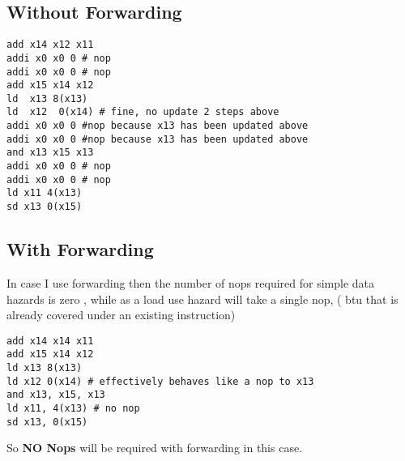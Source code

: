 \subsection{Without Forwarding}
\begin{lstlisting}
add x14 x12 x11
addi x0 x0 0 # nop
addi x0 x0 0 # nop
add x15 x14 x12
ld  x13 8(x13)
ld  x12  0(x14) # fine, no update 2 steps above
addi x0 x0 0 #nop because x13 has been updated above
addi x0 x0 0 #nop because x13 has been updated above
and x13 x15 x13 
addi x0 x0 0 # nop
addi x0 x0 0 # nop
ld x11 4(x13)
sd x13 0(x15)
\end{lstlisting}


\subsection{With Forwarding}
In case I use forwarding then the  number of nops required for simple data hazards is zero , while as  a load use hazard will take a single
nop, ( btu that is already covered under an existing instruction)
\begin{lstlisting}
add x14 x14 x11
add x15 x14 x12 
ld x13 8(x13)
ld x12 0(x14) # effectively behaves like a nop to x13
and x13, x15, x13
ld x11, 4(x13) # no nop
sd x13, 0(x15)
\end{lstlisting}
So \textbf{NO Nops} will be required with forwarding in this case.
